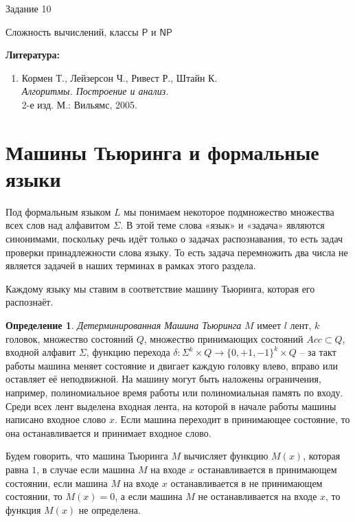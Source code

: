 \documentclass[12pt, leqno]{article}
\theoremstyle{definiton}
\theoremstyle{definition}
\newtheorem{Def}{Определение}
\theoremstyle{definition}
\def\PP{{\mathsf{P}}}
\def\NP{{\mathsf{NP}}}
\begin{document}
\centerline{\LARGE Задание 10}

\medskip

\begin{center}
	{\Large Сложность вычислений, классы $\PP$ и $\NP$ }
\end{center}

\bigskip

{\bf Литература: }
\begin{enumerate}

\item Кормен Т., Лейзерсон Ч., Ривест Р., Штайн К. \\ {\it Алгоритмы. Построение и анализ. }\\  2-е изд. М.: Вильямс, 2005.

\end{enumerate}

\section{Машины Тьюринга и формальные языки}

	Под формальным языком $L$ мы понимаем некоторое подмножество множества всех слов над алфавитом $\Sigma$. В этой теме слова «язык» и «задача» являются синонимами, поскольку речь идёт только о задачах распознавания, то есть задач проверки принадлежности слова языку. То есть задача перемножить два числа не является задачей в наших терминах в рамках этого раздела.
	
	Каждому языку мы ставим в соответствие машину Тьюринга, которая его распознаёт. 

\begin{Def} 

	\emph{Детерминированная Машина Тьюринга} $M$  имеет $l$ лент, $k$ головок, множество состояний $Q$, множество принимающих состояний $Acc \subset Q$,  входной алфавит $\Sigma$, функцию перехода $\delta : \Sigma^k\times Q \to \{0,+1,-1\}^k\times Q  $ -- за такт работы машина меняет состояние и двигает каждую головку влево, вправо или оставляет её неподвижной. На машину могут быть наложены ограничения, например, полиномиальное время работы или полиномиальная память по входу. Среди всех лент выделена входная лента, на которой в начале работы машины написано входное слово $x$. Если машина переходит в принимающее состояние, то она останавливается и принимает входное слово. 
		
\end{Def}


Будем говорить, что машина Тьюринга $M$ вычисляет функцию $M(x)$, которая равна $1$, в случае если машина $M$ на входе $x$ останавливается в принимающем состоянии, если машина $M$ на входе $x$ останавливается в не принимающем состоянии, то $M(x) = 0$, а если машина $M$ не останавливается на входе $x$, то функция $M(x)$ не определена.
\end{document}

